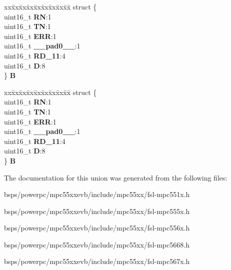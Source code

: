 \begin{DoxyCompactItemize}
\begin{tabbing}
\end{tabbing}\item 
\mbox{\label{unionESCI__tag_1_1ESCI__DR__tag_af9caac353070b0127eca62df772c3591}} 
\begin{tabbing}
xx\=xx\=xx\=xx\=xx\=xx\=xx\=xx\=xx\=\kill
struct \{\\
\>uint16\_t {\bfseries RN}:1\\
\>uint16\_t {\bfseries TN}:1\\
\>uint16\_t {\bfseries ERR}:1\\
\>uint16\_t {\bfseries \_\_pad0\_\_}:1\\
\>uint16\_t {\bfseries RD\_11}:4\\
\>uint16\_t {\bfseries D}:8\\
\} {\bfseries B}\\

\end{tabbing}\item 
\mbox{\label{unionESCI__tag_1_1ESCI__DR__tag_a396762ae22b9f91f4e63435cb471bd9a}} 
\begin{tabbing}
xx\=xx\=xx\=xx\=xx\=xx\=xx\=xx\=xx\=\kill
struct \{\\
\>uint16\_t {\bfseries RN}:1\\
\>uint16\_t {\bfseries TN}:1\\
\>uint16\_t {\bfseries ERR}:1\\
\>uint16\_t {\bfseries \_\_pad0\_\_}:1\\
\>uint16\_t {\bfseries RD\_11}:4\\
\>uint16\_t {\bfseries D}:8\\
\} {\bfseries B}\\

\end{tabbing}\end{DoxyCompactItemize}


The documentation for this union was generated from the following files\+:\begin{DoxyCompactItemize}
\item 
bsps/powerpc/mpc55xxevb/include/mpc55xx/fsl-\/mpc551x.\+h\item 
bsps/powerpc/mpc55xxevb/include/mpc55xx/fsl-\/mpc555x.\+h\item 
bsps/powerpc/mpc55xxevb/include/mpc55xx/fsl-\/mpc556x.\+h\item 
bsps/powerpc/mpc55xxevb/include/mpc55xx/fsl-\/mpc5668.\+h\item 
bsps/powerpc/mpc55xxevb/include/mpc55xx/fsl-\/mpc567x.\+h\end{DoxyCompactItemize}
